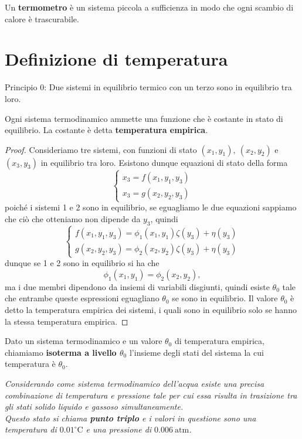 \begin{definition}[Termometro]
Un \textbf{termometro} \`e un sistema piccola a sufficienza in modo che ogni scambio di calore \`e trascurabile.
\end{definition}

\section{Definizione di temperatura}
Principio $0$: Due sistemi in equilibrio termico con un terzo sono in equilibrio tra loro.

\begin{proposition}\label{TemperaturaEmpirica}
Ogni sistema termodinamico ammette una funzione che \`e costante in stato di equilibrio. La costante \`e detta \textbf{temperatura empirica}.
\end{proposition}
\begin{proof}
Consideriamo tre sistemi, con funzioni di stato $(x_1, y_1),\ (x_2,y_2)$ e $(x_3,y_3)$ in equilibrio tra loro. Esistono dunque equazioni di stato della forma
\[\begin{cases}
x_3=f(x_1,y_1,y_3)\\
x_3=g(x_2,y_2,y_3)
\end{cases}\]
poich\'e i sistemi 1 e 2 sono in equilibrio, se eguagliamo le due equazioni sappiamo che ci\`o che otteniamo non dipende da $y_3$, quindi
\[\begin{cases}
f(x_1,y_1,y_3)=\phi_1(x_1,y_1)\zeta(y_3)+\eta(y_3)\\
g(x_2,y_2,y_3)=\phi_2(x_2,y_2)\zeta(y_3)+\eta(y_3)
\end{cases}\]
dunque se 1 e 2 sono in equilibrio si ha che 
\[\phi_1(x_1,y_1)=\phi_2(x_2,y_2),\]
ma i due membri dipendono da insiemi di variabili disgiunti, quindi esiste $\theta_0$ tale che entrambe queste espressioni eguagliano $\theta_0$ se sono in equilibrio. Il valore $\theta_0$ \`e detto la temperatura empirica dei sistemi, i quali sono in equilibrio solo se hanno la stessa temperatura empirica.
\end{proof}

\begin{definition}[Isoterme]
Dato un sistema termodinamico e un valore $\theta_0$ di temperatura empirica, chiamiamo \textbf{isoterma a livello $\theta_0$} l'insieme degli stati del sistema la cui temperatura \`e $\theta_0$.
\end{definition}


\begin{fact}
\emph{Considerando come sistema termodinamico dell'acqua esiste una precisa combinazione di temperatura e pressione tale per cui essa risulta in trasizione tra gli stati solido liquido e gassoso simultaneamente.\\
Questo stato si chiama \textbf{punto triplo} e i valori in questione sono una temperatura di $0.01 ^\circ \mathrm{C}$ e una pressione di $0.006\ \mathrm{atm}$.}
\end{fact}


